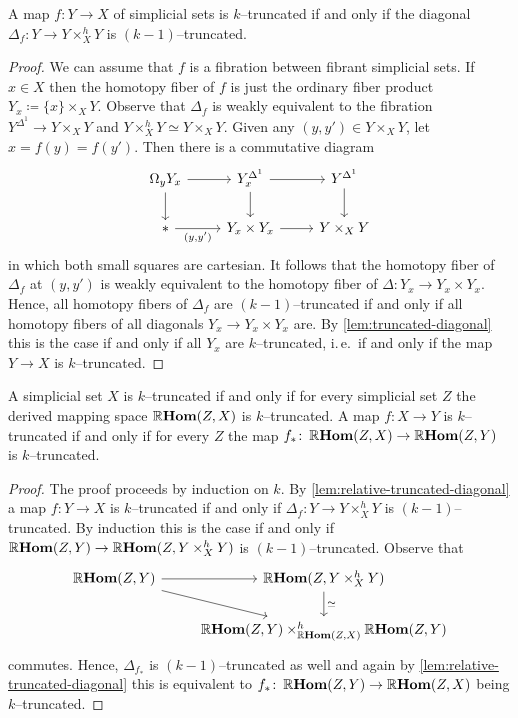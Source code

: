 \begin{lemma}\label{lem:relative-truncated-diagonal}
  A map \(f\colon Y\to X\) of simplicial sets is \(k\)--truncated if
  and only if the diagonal \(\Delta_{f}\colon Y\to Y\times^{h}_{X} Y\)
  is \((k-1)\)--truncated.
\end{lemma}
\begin{proof}
  We can assume that \(f\) is a fibration between fibrant simplicial
  sets. If \(x\in X\) then the homotopy fiber of \(f\) is just the
  ordinary fiber product \(Y_{x}\coloneqq \{x\}\times_{X} Y\). Observe
  that \(\Delta_{f}\) is weakly equivalent to the fibration
  \(Y^{\Delta^{1}}\to Y\times_{X} Y\) and \(Y\times_{X}^{h} Y \simeq
  Y\times_{X} Y\). Given any \((y, y')\in Y\times_{X} Y\), let \(x =
  f(y) = f(y')\). Then there is a commutative diagram
  \[
  \begin{tikzcd}
    \Omega_{y} Y_{x} \arrow[r] \arrow[d] & Y_{x}^{\Delta^{1}} \arrow[r] \arrow[d] & Y^{\Delta^{1}} \arrow[d] \\
    * \arrow[r, "{(y,y')}"'] & Y_{x}\times Y_{x} \arrow[r] & Y\times_{X} Y
  \end{tikzcd}
  \]
  in which both small squares are cartesian. It follows that the
  homotopy fiber of \(\Delta_{f}\) at \((y,y')\) is weakly equivalent
  to the homotopy fiber of \(\Delta\colon Y_{x}\to Y_{x}\times
  Y_{x}\). Hence, all homotopy fibers of \(\Delta_{f}\) are
  \((k-1)\)--truncated if and only if all homotopy fibers of all
  diagonals \(Y_{x}\to Y_{x}\times Y_{x}\) are. By
  \autoref{lem:truncated-diagonal} this is the case if and only if all
  \(Y_{x}\) are \(k\)--truncated, i.\,e.~if and only if the map \(Y\to
  X\) is \(k\)--truncated.
\end{proof}

\begin{corollary}\label{cor:truncatedness-makes-sense}
  A simplicial set \(X\) is \(k\)--truncated if and only if for every
  simplicial set \(Z\) the derived mapping space \(\operatorname{\mathbb{R}\textnormal{\bfseries Hom}}(Z, X)\) is
  \(k\)--truncated. A map \(f\colon X\to Y\) is \(k\)--truncated if
  and only if for every \(Z\) the map \(f_{*}\colon \operatorname{\mathbb{R}\textnormal{\bfseries Hom}}(Z,
  X)\to\operatorname{\mathbb{R}\textnormal{\bfseries Hom}}(Z, Y)\) is \(k\)--truncated.
\end{corollary}
\begin{proof}
  The proof proceeds by induction on \(k\). By
  \autoref{lem:relative-truncated-diagonal} a map \(f\colon Y\to X\)
  is \(k\)--truncated if and only if \(\Delta_{f}\colon Y\to
  Y\times_{X}^{h} Y\) is \((k-1)\)--truncated. By induction this is
  the case if and only if \(\operatorname{\mathbb{R}\textnormal{\bfseries Hom}}(Z,Y)\to \operatorname{\mathbb{R}\textnormal{\bfseries Hom}}(Z, Y\times_{X}^{h}
  Y)\) is \((k-1)\)--truncated. Observe that
  \[
  \begin{tikzcd}
    \RHom(Z,Y) \arrow[r] \arrow[dr] & \RHom(Z, Y\times^{h}_{X} Y) \arrow[d, "\simeq"] \\
    {} & \RHom(Z, Y)\times_{\RHom(Z, X)}^{h} \RHom(Z,Y)
  \end{tikzcd}
  \]
  commutes. Hence, \(\Delta_{f_{*}}\) is \((k-1)\)--truncated as well
  and again by \autoref{lem:relative-truncated-diagonal} this is
  equivalent to \(f_{*}\colon \operatorname{\mathbb{R}\textnormal{\bfseries Hom}}(Z, Y)\to\operatorname{\mathbb{R}\textnormal{\bfseries Hom}}(Z, X)\) being
  \(k\)--truncated.
\end{proof}

